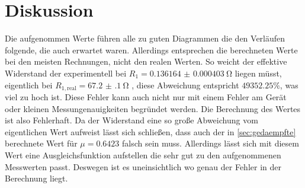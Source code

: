 \section{Diskussion}
\label{sec:Diskussion}

Die aufgenommen Werte führen alle zu guten Diagrammen die den Verläufen folgende, die auch erwartet waren.
Allerdings entsprechen die berechneten Werte bei den meisten Rechnungen, nicht den realen Werten.
So weicht der effektive Widerstand der experimentell bei $R_1 = \SI{0.136164(403)}{\ohm}$ liegen müsst, eigentlich bei 
$R_{1,\text{real}}=\SI{67.2(1)}{\ohm}$ , diese Abweichung entspricht $49352.25 \%$, was viel zu hoch ist.
Diese Fehler kann auch nicht nur mit einem Fehler am Gerät oder kleinen Messungenauigkeiten begründet werden.
Die Berechnung des Wertes ist also Fehlerhaft.
Da der Widerstand eine so große Abweichung vom eigentlichen Wert aufweist lässt sich schließen, dass auch der in \ref{sec:gedaempfte} berechnete Wert für $\mu=0.6423$ falsch sein muss.
Allerdings lässt sich mit diesem Wert eine Ausgleichsfunktion aufstellen die sehr gut zu den aufgenommenen Messwerten passt.
Deswegen ist es uneinsichtlich wo genau der Fehler in der Berechnung liegt.
 